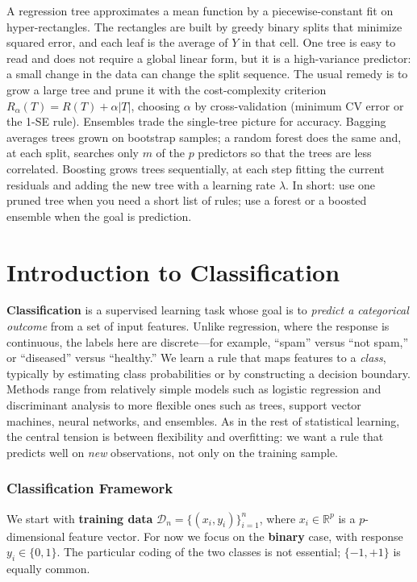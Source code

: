 \documentclass[
]{book}
\begin{document}
A regression tree approximates a mean function by a piecewise-constant fit on hyper-rectangles. The rectangles are built by greedy binary splits that minimize squared error, and each leaf is the average of \(Y\) in that cell. One tree is easy to read and does not require a global linear form, but it is a high-variance predictor: a small change in the data can change the split sequence. The usual remedy is to grow a large tree and prune it with the cost-complexity criterion \(R_\alpha(T)=R(T)+\alpha|T|\), choosing \(\alpha\) by cross-validation (minimum CV error or the 1-SE rule). Ensembles trade the single-tree picture for accuracy. Bagging averages trees grown on bootstrap samples; a random forest does the same and, at each split, searches only \(m\) of the \(p\) predictors so that the trees are less correlated. Boosting grows trees sequentially, at each step fitting the current residuals and adding the new tree with a learning rate \(\lambda\). In short: use one pruned tree when you need a short list of rules; use a forest or a boosted ensemble when the goal is prediction.

\chapter{Introduction to Classification}\label{introduction-to-classification}

\textbf{Classification} is a supervised learning task whose goal is to \emph{predict a categorical outcome} from a set of input features. Unlike regression, where the response is continuous, the labels here are discrete---for example, ``spam'' versus ``not spam,'' or ``diseased'' versus ``healthy.'' We learn a rule that maps features to a \emph{class}, typically by estimating class probabilities or by constructing a decision boundary. Methods range from relatively simple models such as logistic regression and discriminant analysis to more flexible ones such as trees, support vector machines, neural networks, and ensembles. As in the rest of statistical learning, the central tension is between flexibility and overfitting: we want a rule that predicts well on \emph{new} observations, not only on the training sample.

\subsection*{Classification Framework}\label{classification-framework}

We start with \textbf{training data} \(\mathcal{D}_n = \{(x_i, y_i)\}_{i=1}^{n}\), where \(x_i \in \mathbb{R}^p\) is a \(p\)-dimensional feature vector. For now we focus on the \textbf{binary} case, with response \(y_i \in \{0, 1\}\). The particular coding of the two classes is not essential; \(\{-1, +1\}\) is equally common.
\end{document}
